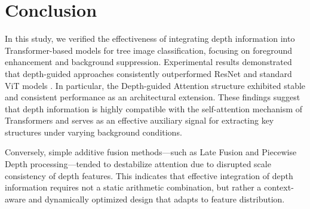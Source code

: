 \section{Conclusion}

In this study, we verified the effectiveness of integrating depth information into Transformer-based models for tree image classification, focusing on foreground enhancement and background suppression. Experimental results demonstrated that depth-guided approaches consistently outperformed ResNet \cite{ref12} and standard ViT models \cite{ref1}. In particular, the Depth-guided Attention structure exhibited stable and consistent performance as an architectural extension. These findings suggest that depth information is highly compatible with the self-attention mechanism of Transformers and serves as an effective auxiliary signal for extracting key structures under varying background conditions.

Conversely, simple additive fusion methods—such as Late Fusion and Piecewise Depth processing—tended to destabilize attention due to disrupted scale consistency of depth features. This indicates that effective integration of depth information requires not a static arithmetic combination, but rather a context-aware and dynamically optimized design that adapts to feature distribution.

